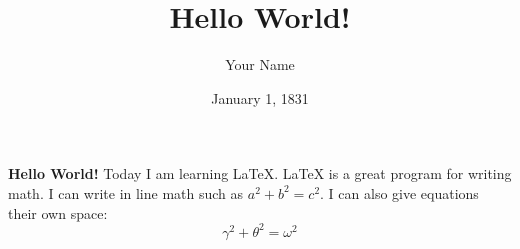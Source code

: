 \documentclass{article}
\title{Hello World!}
\author{Your Name}
\date{January 1, 1831}
\begin{document}
    \maketitle
    
    \textbf{Hello World!} Today I am learning \LaTeX. \LaTeX{} is a great program for writing math. I can write in line math such as $a^2+b^2=c^2$. I can also give equations their own space: \[ \gamma^2+\theta^2=\omega^2\]
\end{document}
